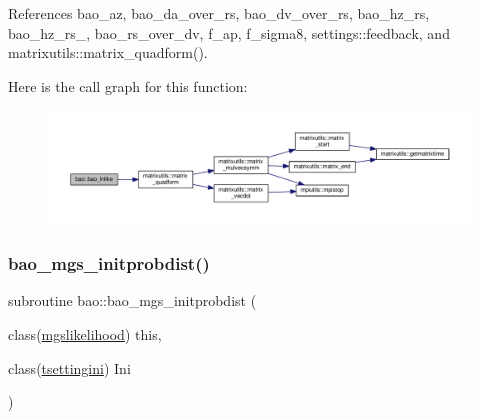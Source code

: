 References bao\+\_\+az, bao\+\_\+da\+\_\+over\+\_\+rs, bao\+\_\+dv\+\_\+over\+\_\+rs, bao\+\_\+hz\+\_\+rs, bao\+\_\+hz\+\_\+rs\+\_, bao\+\_\+rs\+\_\+over\+\_\+dv, f\+\_\+ap, f\+\_\+sigma8, settings\+::feedback, and matrixutils\+::matrix\+\_\+quadform().

Here is the call graph for this function\+:
\nopagebreak
\begin{figure}[H]
\begin{center}
\leavevmode
\includegraphics[width=350pt]{namespacebao_a9a4c24c4606056286bb571c62350ccb3_cgraph}
\end{center}
\end{figure}
\mbox{\label{namespacebao_aec7bdc5f03a9da432a0345932d1401bd}} 
\subsubsection{\texorpdfstring{bao\+\_\+mgs\+\_\+initprobdist()}{bao\_mgs\_initprobdist()}}
{\footnotesize\ttfamily subroutine bao\+::bao\+\_\+mgs\+\_\+initprobdist (\begin{DoxyParamCaption}\item[{class(\mbox{\hyperlink{structbao_1_1mgslikelihood}{mgslikelihood}})}]{this,  }\item[{class(\mbox{\hyperlink{structsettings_1_1tsettingini}{tsettingini}})}]{Ini }\end{DoxyParamCaption})\hspace{0.3cm}{\ttfamily [private]}}

\mbox{\label{namespacebao_aa39f8163fd5d4a39d7d83bab1a485ee2}} 
